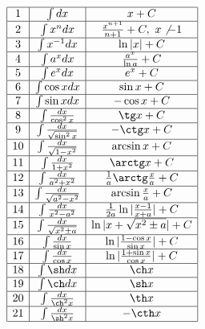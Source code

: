 \documentclass{article}
\begin{document}
\begin{displaymath}
\begin{array}{|c|c|c|}
  \hline
  1 &\int dx & x + C\\
  \hline
  2 &\int x^{n}dx &\frac{x^{n+1}}{n+1} + C, ~ x \not -1\\
  \hline
  3 &\int x^{-1}dx &\ln |x| + C\\
  \hline
  4 &\int a^{x}dx &\frac{a^x}{\ln a} + C\\
  \hline 
  5 &\int e^{x}dx &e^x + C\\
  \hline
  6 &\int \cos x dx &\sin x + C\\
  \hline
  7 &\int \sin x dx &-\cos x + C\\
  \hline
  8 &\int \frac{dx}{\cos^2 x} &\tg x + C\\
  \hline
  9 &\int \frac{dx}{\sqrt{\sin^2 x}} &-\ctg x + C\\
  \hline
  10&\int \frac{dx}{\sqrt{1-x^2}} &\arcsin x + C\\
  \hline 
  11&\int \frac{dx}{1+x^2} &\arctg x + C\\
  \hline
  12&\int \frac{dx}{a^2+x^2} &\frac{1}{a}\arctg \frac{x}{a} + C\\
  \hline
  13&\int \frac{dx}{\sqrt{a^2-x^2}}& \arcsin \frac{x}{a} + C\\
  \hline 
  14&\int \frac{dx}{x^2-a^2} &\frac{1}{2a}\ln |\frac{x-1}{x+a}| + C\\
  \hline 
  15&\int \frac{dx}{\sqrt{x^2 \pm a}} &\ln |x + \sqrt{x^2 \pm a}| + C\\
  \hline
  16&\int \frac{dx}{\sin x} &\ln |\frac{1-\cos x}{\sin x}| + C\\
  \hline
  17&\int \frac{dx}{\cos x} &\ln |\frac{1+\sin x}{\cos x}| + C\\
  \hline
  18&\int \sh dx &\ch x\\
  \hline
  19&\int \ch dx &\sh x\\
  \hline
  20&\int \frac{dx}{\ch^2 x} & {\th} x\\
  \hline
  21&\int \frac{dx}{\sh^2 x} & -\cth x\\
  \hline
\end{array}
\end{displaymath}
\end{document}
